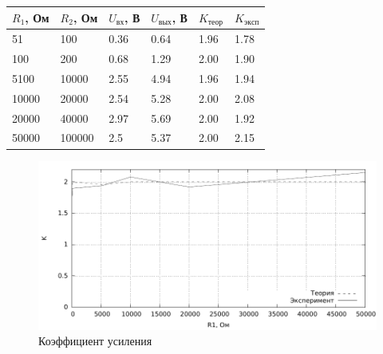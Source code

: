 \begin{tabular}{|l|l|l|l|l|l|}
\hline
$R_1$, Ом & $R_2$, Ом & $U_{вх}$, В & $U_{вых}$, В & $K_{теор}$ & $K_{эксп}$ \\
\hline
51&100&0.36&0.64&1.96&1.78\\
\hline
100&200&0.68&1.29&2.00&1.90\\
\hline
5100&10000&2.55&4.94&1.96&1.94\\
\hline
10000&20000&2.54&5.28&2.00&2.08\\
\hline
20000&40000&2.97&5.69&2.00&1.92\\
\hline
50000&100000&2.5&5.37&2.00&2.15\\
\hline
\end{tabular}
\begin{figure}[H]
\includegraphics[scale=1]{3.pdf}
\caption{Коэффициент усиления}
\end{figure}